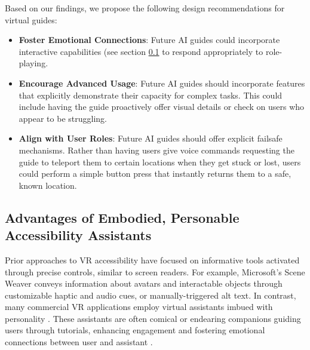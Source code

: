 Based on our findings, we propose the following design recommendations for virtual guides:

\begin{itemize}
\item \textbf{Foster Emotional Connections}: Future AI guides could incorporate interactive capabilities (see section \ref{sec: Advantages of Embodied, Personable Accessibility Assistants} to respond appropriately to role-playing.
\item \textbf{Encourage Advanced Usage}: Future AI guides should incorporate features that explicitly demonstrate their capacity for complex tasks. This could include having the guide proactively offer visual details or check on users who appear to be struggling.
\item \textbf{Align with User Roles}: Future AI guides should offer explicit failsafe mechanisms. Rather than having users give voice commands requesting the guide to teleport them to certain locations when they get stuck or lost, users could perform a simple button press that instantly returns them to a safe, known location.
\end {itemize}

\subsection{Advantages of Embodied, Personable Accessibility Assistants} \label{sec: Advantages of Embodied, Personable Accessibility Assistants}

Prior approaches to VR accessibility have focused on informative tools activated through precise controls, similar to screen readers. For example, Microsoft’s Scene Weaver \cite{balasubramanian2023sceneweaver} conveys information about avatars and interactable objects through customizable haptic and audio cues, or manually-triggered alt text. In contrast, many commercial VR applications employ virtual assistants imbued with personality \cite{nathie2019presence, oculus2019first, moss2018review, ven2021vr, cosmonious2022walkthrough}. These assistants are often comical or endearing companions guiding users through tutorials, enhancing engagement and fostering emotional connections between user and assistant \cite{nathie2019presence, cosmonious2022walkthrough, lakereddit, fink2022review, graf2022emotional, clavel2013artificial, sutskova2023cognitive, freeman2025comforting}.

